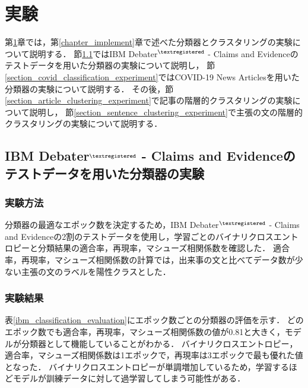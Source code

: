 \documentclass[12pt,a4j,dvipdfmx]{jreport}
\begin{document}
\chapter{実験}
\label{chapter_experiment}

第\ref{chapter_experiment}章では，第\ref{chapter_implement}章で述べた分類器とクラスタリングの実験について説明する．
節\ref{section_ibm_classification_experiment}ではIBM Debater$^{\textregistered}$ - Claims and Evidenceのテストデータを用いた分類器の実験について説明し，
節\ref{section_covid_classification_experiment}ではCOVID-19 News Articlesを用いた分類器の実験について説明する．
その後，節\ref{section_article_clustering_experiment}で記事の階層的クラスタリングの実験について説明し，
節\ref{section_sentence_clustering_experiment}で主張の文の階層的クラスタリングの実験について説明する．

\section{IBM Debater$^{\textregistered}$ - Claims and Evidenceのテストデータを用いた分類器の実験}
\label{section_ibm_classification_experiment}

\subsection{実験方法}
分類器の最適なエポック数を決定するため，IBM Debater$^{\textregistered}$ - Claims and Evidenceの2割のテストデータを使用し，学習ごとのバイナリクロスエントロピーと分類結果の適合率，再現率，マシューズ相関係数を確認した．
適合率，再現率，マシューズ相関係数の計算では，出来事の文と比べてデータ数が少ない主張の文のラベルを陽性クラスとした．

\subsection{実験結果}
表\ref{ibm_classification_evaluation}にエポック数ごとの分類器の評価を示す．
どのエポック数でも適合率，再現率，マシューズ相関係数の値が0.81と大きく，モデルが分類器として機能していることがわかる．
バイナリクロスエントロピー，適合率，マシューズ相関係数は1エポックで，再現率は3エポックで最も優れた値となった．
バイナリクロスエントロピーが単調増加しているため，学習するほどモデルが訓練データに対して過学習してしまう可能性がある．
\end{document}
